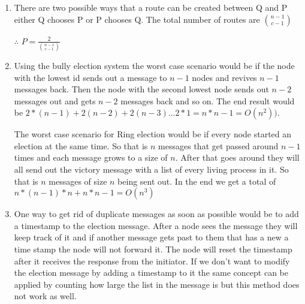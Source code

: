 \documentclass{article}
\begin{document}
\begin{enumerate}
\item
There are two possible ways that a route can be created between Q and P either Q chooses P or P chooses Q. The total number of routes are \( \binom{n-1}{c-1}\)

\centerline{\Large$ \therefore $
\(
 P= \frac {2}{\binom{n-1}{c-1}}
\)
}

\item Using the bully election system the worst case scenario would be if the node with the lowest id sends out a message to \(n-1\) nodes and revives \(n-1\) messages back. Then the node with the second lowest node sends out \(n-2\) messages out and gets \(n-2\) messages back and so on. The end result would be \(2*(n-1)+2(n-2)+2(n-3)... 2*1= n*n-1 = O(n^2)) \).

The worst case scenario for Ring election would be if every node started an election at the same time. So that is \(n\) messages that get passed around \(n-1\) times and each message grows to a size of \(n\). After that goes around they will all send out the victory message with a list of every living process in it. So that is \(n\) messages of size \(n\) being sent out. In the end we get a total of  \(n*(n-1)*n+n*n-1 =O(n^3)\)


\item One way to get rid of duplicate messages as soon as possible would be to add a timestamp to the election message. After a node sees the message they will keep track of it and if another message gets past to them that has a new a time stamp the node will not forward it. The node will reset the timestamp after it receives the response from the initiator. If we don’t want to modify the election message by adding a timestamp to it the same concept can be applied by counting how large the list in the message is but this method does not work as well.

\end{enumerate}
\end{document}
